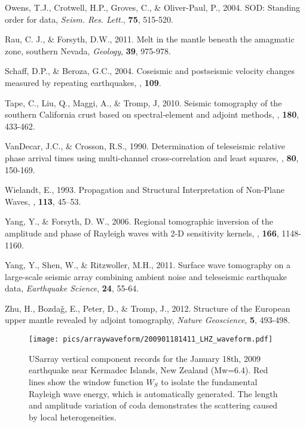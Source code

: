 \documentclass[referee]{gji}
\begin{document}
\begin{thebibliography}{}
	   Owens, T.J., Crotwell, H.P., Groves, C., \& Oliver-Paul, P., 2004. SOD: Standing order for data, \textit{Seism. Res. Lett.}, \textbf{75}, 515-520.

	   Rau, C. J., \& Forsyth, D.W., 2011. Melt in the mantle beneath the amagmatic zone, southern Nevada, \textit{Geology}, \textbf{39}, 975-978.

	   Schaff, D.P., \& Beroza, G.C., 2004. Coseismic and postseismic velocity changes measured by repeating earthquakes, \textit{\jgr}, \textbf{109}.

	   Tape, C., Liu, Q., Maggi, A., \& Tromp, J, 2010. Seismic tomography of the southern California crust based on spectral‐element and adjoint methods, \textit{\gji}, \textbf{180}, 433-462.

	   VanDecar, J.C., \& Crosson, R.S., 1990. Determination of teleseismic relative phase arrival times using multi-channel cross-correlation and least squares, \textit{\bssa}, \textbf{80}, 150-169.

	   Wielandt, E., 1993. Propagation and Structural Interpretation of Non‐Plane Waves, \textit{\gji}, \textbf{113}, 45–53.

	   Yang, Y., \& Forsyth, D. W., 2006. Regional tomographic inversion of the amplitude and phase of Rayleigh waves with 2-D sensitivity kernels, \textit{\gji}, \textbf{166}, 1148-1160.

	   Yang, Y., Shen, W., \& Ritzwoller, M.H., 2011. Surface wave tomography on a large-scale seismic array combining ambient noise and teleseismic earthquake data, \textit{Earthquake Science}, \textbf{24}, 55-64.

	   Zhu, H., Bozda\v{g}, E., Peter, D., \& Tromp, J., 2012. Structure of the European upper mantle revealed by adjoint tomography, \textit{Nature Geoscience}, \textbf{5}, 493-498.

\end{thebibliography}

\begin{figure}
	\texttt{[image: pics/arraywaveform/200901181411\_LHZ\_waveform.pdf]}	
	\caption{USarray vertical component records for the January 18th, 2009 earthquake near Kermadec Islands, New Zealand (Mw=6.4). Red lines show the window function $W_S$ to isolate the fundamental Rayleigh wave energy, which is automatically generated. The length and amplitude variation of coda demonstrates the scattering caused by local heterogeneities.}
	\label{fig:arraywaveform}
\end{figure}
\end{document}
